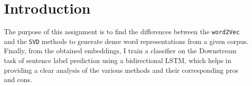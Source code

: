 \section*{Introduction}
\label{sec:introduction}

The purpose of this assignment is to find the differences between the \verb|word2Vec| and the \verb|SVD| methods to generate dense word representations from a given corpus. Finally, from the obtained embeddings, I train a classifier on the Downstream task of sentence label prediction using a bidirectional LSTM, which helps in providing a clear analysis of the various methods and their corresponding pros and cons.
